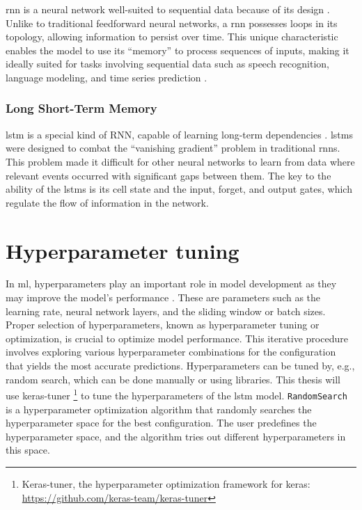 \ac{rnn} is a neural network well-suited to sequential data because of its design \cite{hopfield-rnn}.
Unlike to traditional feedforward neural networks, a \ac{rnn} possesses loops in its topology, allowing information to persist over time.
This unique characteristic enables the model to use its ``memory'' to process sequences of inputs, making it ideally suited for tasks involving sequential data such as speech recognition, language modeling, and time series prediction \cite{elman_finding_1990}.

\subsubsection{Long Short-Term Memory}

\ac{lstm} is a special kind of RNN, capable of learning long-term dependencies \cite{lstm-hochreiter}.
\acp{lstm} were designed to combat the ``vanishing gradient'' problem in traditional \acp{rnn}. 
This problem made it difficult for other neural networks to learn from data where relevant events occurred with significant gaps between them.
The key to the ability of the \acp{lstm} is its cell state and the input, forget, and output gates, which regulate the flow of information in the network.

\section{Hyperparameter tuning}\label{sec:hyperparameter-tuning}

In \ac{ml}, hyperparameters play an important role in model development as they may improve the model's performance \cite{yuHyperParameterOptimizationReview2020}.
These are parameters such as the learning rate, neural network layers, and the sliding window or batch sizes.
Proper selection of hyperparameters, known as hyperparameter tuning or optimization, is crucial to optimize model performance.
This iterative procedure involves exploring various hyperparameter combinations for the configuration that yields the most accurate predictions.
Hyperparameters can be tuned by, e.g., random search, which can be done manually or using libraries.
This thesis will use keras-tuner \footnote{Keras-tuner, the hyperparameter optimization framework for keras: \url{https://github.com/keras-team/keras-tuner}} to tune the hyperparameters of the \ac{lstm} model.
\texttt{RandomSearch} is a hyperparameter optimization algorithm that randomly searches the hyperparameter space for the best configuration.
The user predefines the hyperparameter space, and the algorithm tries out different hyperparameters in this space.
